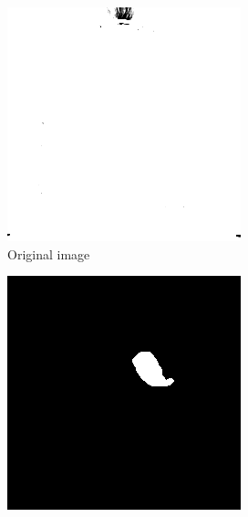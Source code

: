 \begin{figure}
  \centering
  \begin{subfigure}[t]{.32\textwidth}
    \centering
    \includegraphics[width=\textwidth]{images/IMG0138_example.png}
    \caption{Original image}
  \end{subfigure}
  \hfill
  \begin{subfigure}[t]{.32\textwidth}
    \centering
    \includegraphics[width=\textwidth]{images/IMG0138_MASS_example.png}

\end{subfigure}
\end{figure}

